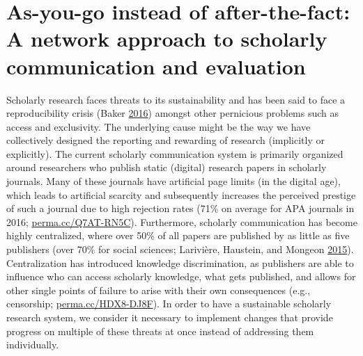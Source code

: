 \documentclass[a5paper]{book}
\begin{document}
\chapter{As-you-go instead of after-the-fact: A network approach to
scholarly communication and
evaluation}\label{as-you-go-instead-of-after-the-fact-a-network-approach-to-scholarly-communication-and-evaluation}

Scholarly research faces threats to its sustainability and has been said
to face a reproducibility crisis (Baker
\protect\hyperlink{ref-doi:10.1038ux2f533452a}{2016}) amongst other
pernicious problems such as access and exclusivity. The underlying cause
might be the way we have collectively designed the reporting and
rewarding of research (implicitly or explicitly). The current scholarly
communication system is primarily organized around researchers who
publish static (digital) research papers in scholarly journals. Many of
these journals have artificial page limits (in the digital age), which
leads to artificial scarcity and subsequently increases the perceived
prestige of such a journal due to high rejection rates (71\% on average
for APA journals in 2016;
\href{https://perma.cc/Q7AT-RN5C}{perma.cc/Q7AT-RN5C}). Furthermore,
scholarly communication has become highly centralized, where over 50\%
of all papers are published by as little as five publishers (over 70\%
for social sciences; Larivière, Haustein, and Mongeon
\protect\hyperlink{ref-doi:10.1371ux2fjournal.pone.0127502}{2015}).
Centralization has introduced knowledge discrimination, as publishers
are able to influence who can access scholarly knowledge, what gets
published, and allows for other single points of failure to arise with
their own consequences (e.g., censorship;
\href{https://perma.cc/HDX8-DJ8F}{perma.cc/HDX8-DJ8F}). In order to have
a sustainable scholarly research system, we consider it necessary to
implement changes that provide progress on multiple of these threats at
once instead of addressing them individually.
\end{document}
